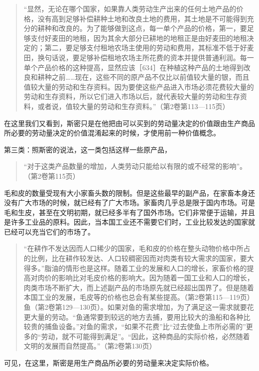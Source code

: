 \begin{quote}{“显然，无论在哪个国家，如果靠人类劳动生产出来的任何土地产品的价格，没有高到足够补偿耕种土地和改良土地的费用，其土地是不可能得到充分的耕种和改良的。为了能够做到这点，每一单个产品的价格，第一，要足够支付好麦田的地租，因为其余大部分已耕地的地租正是由好麦田的地租决定的；第二，要足够支付租地农场主使用的劳动和费用，其标准不低于好麦田，换句话说，要足够补偿租地农场主所花费的资本并提供普通利润。每一单个产品价格的这种提高，显然应该［634］在种植这种产品的土地得到改良和耕种之前……现在，这些不同的原产品不仅比以前值较大量的银，而且值较大量的劳动和生存资料。因为要使这些产品进入市场必须花费较大量的劳动和生存资料，所以它们进入市场以后，就代表较大量的劳动和生存资料，或者说，值较大量的劳动和生存资料。”（第2卷第113—115页）}\end{quote}

在这里我们又看到，斯密只是在他把由可以买到的劳动量决定的价值跟由生产商品所必要的劳动量决定的价值混淆起来的时候，才使用前一种价值概念。

第三类：照斯密的说法，这一类包括这样一些原产品，

\begin{quote}{“对于这类产品数量的增加，人类劳动只能给以有限的或不经常的影响”。（第2卷第115页）}\end{quote}

毛和皮的数量受现有大小家畜头数的限制。但是这些最早的副产品，在家畜本身还没有广大市场的时候，就已经有了广大市场。家畜肉几乎总是限于国内市场。可是毛和生皮，甚至在文明初期，就已经多半有了国外市场。它们非常便于运输，并且是许多工业品的原料。因此，当本国工业还不需要它们时，工业比较发达的国家就已经可以充当它们的市场了。

\begin{quote}{“在耕作不发达因而人口稀少的国家，毛和皮的价格在整头动物价格中所占的比例，比在耕作较发达、人口较稠密因而对肉类有较大需求的国家，要大得多。”脂油的情形也是这样。随着工业的发展和人口的增长，家畜价格的提高对肉价的影响比对毛皮价格的影响大。因为随着一国工业和人口的增长，肉类市场不断扩大，而上述副产品的市场原先就已经超出国界了。但是随着本国工业的发展，毛皮等的价格也总会有某些提高。（第2卷第115—119页）鱼（第2卷第129—130页）。如果对鱼的需求增加，为了满足这一需求就要花更大量的劳动。“鱼通常要到较远的地方去捕，要用比较大的渔船和各种比较贵的捕鱼设备。”对鱼的需求，“如果不花费”比“过去使鱼上市所必需的”更多的“劳动，就不可能得到满足”。“因此，这种商品的实际价格，必然随着文明的发展而自然提高。”（第2卷第130页）}\end{quote}

可见，在这里，斯密是用生产商品所必要的劳动量来决定实际价格。

